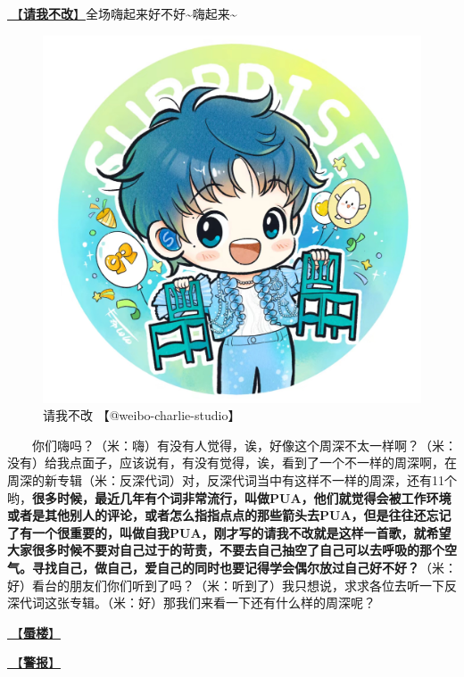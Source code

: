 \documentclass[]{ctexbook}
\begin{document}
\hyperref[brave-heart]{🎵【\textbf{请我不改}】}全场嗨起来好不好\textasciitilde 嗨起来\textasciitilde{}

\begin{figure}

{\centering \includegraphics[width=400pt]{img/chongqing20241007/001} 

}

\caption{请我不改 【@weibo-charlie-studio】}\label{fig:unnamed-chunk-118}
\end{figure}

  你们嗨吗？（米：嗨）有没有人觉得，诶，好像这个周深不太一样啊？（米：没有）给我点面子，应该说有，有没有觉得，诶，看到了一个不一样的周深啊，在周深的新专辑（米：反深代词）对，反深代词当中有这样不一样的周深，还有11个哟，\textbf{很多时候，最近几年有个词非常流行，叫做PUA，他们就觉得会被工作环境或者是其他别人的评论，或者怎么指指点点的那些箭头去PUA，但是往往还忘记了有一个很重要的，叫做自我PUA，刚才写的请我不改就是这样一首歌，就希望大家很多时候不要对自己过于的苛责，不要去自己抽空了自己可以去呼吸的那个空气。寻找自己，做自己，爱自己的同时也要记得学会偶尔放过自己好不好？}（米：好）看台的朋友们你们听到了吗？（米：听到了）我只想说，求求各位去听一下反深代词这张专辑。（米：好）那我们来看一下还有什么样的周深呢？

\hyperref[mirage]{🎵【\textbf{蜃楼}】}

\hyperref[the-giver]{🎵【\textbf{警报}】}
\end{document}
